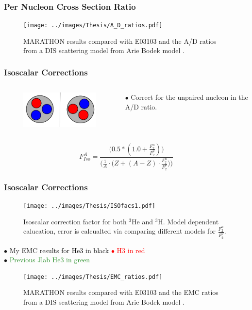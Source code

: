 \documentclass[12pt,usenames,dvipsnames]{beamer}
\begin{document}
\begin{frame}{}
\frametitle{Per Nucleon Cross Section Ratio}
\vspace{-20pt}
\begin{figure}
	\texttt{[image: ../images/Thesis/A\_D\_ratios.pdf]}
	\caption*{MARATHON results compared with E03103 \cite{E3103} and the A/D ratios from a DIS scattering model from Arie Bodek model \cite{bodek}.}
\end{figure}

\end{frame}

\begin{frame}{}
\frametitle{Isoscalar Corrections}
\vspace*{-1cm}
\begin{columns}
	\begin{figure}
		\includegraphics[width =5cm]{../images/mirror}
	\end{figure}
	$\bullet$ Correct for the unpaired nucleon in the A/D ratio.	
\end{columns}
\begin{equation}
F^A_{Iso} = \frac{\Big(0.5*(1.0 + \frac{F_2^n}{F_2^p})\Big)}{ \Big(\frac{1}{A} \cdot \big(Z+(A-Z)\cdot \frac{F_2^n}{F_2^p}\big) \Big) }\nonumber
\end{equation}

\end{frame}

\begin{frame}{}
\frametitle{Isoscalar Corrections}
\vspace*{-0.75cm}

\begin{figure}
	\texttt{[image: ../images/Thesis/ISOfacs1.pdf]}
	\caption*{Isoscalar correction factor for both $^3$He and $^3$H. Model dependent calucation, error is calcualted via comparing different models for $\frac{F_2^n}{F_2^p}$.}
\end{figure}

\end{frame}
\begin{frame}{}
$\bullet$ My EMC results for \textcolor{black}{He3 in black} \textcolor{red}{$\bullet$ H3 in red}\\
$\bullet$ \textcolor{ForestGreen}{Previous Jlab He3 in green}
\begin{figure}
	\texttt{[image: ../images/Thesis/EMC\_ratios.pdf]}
	\caption*{MARATHON results compared with E03103 \cite{E3103} and the EMC ratios from a DIS scattering model from Arie Bodek model \cite{bodek}.}
\end{figure}
\end{frame}
\end{document}
